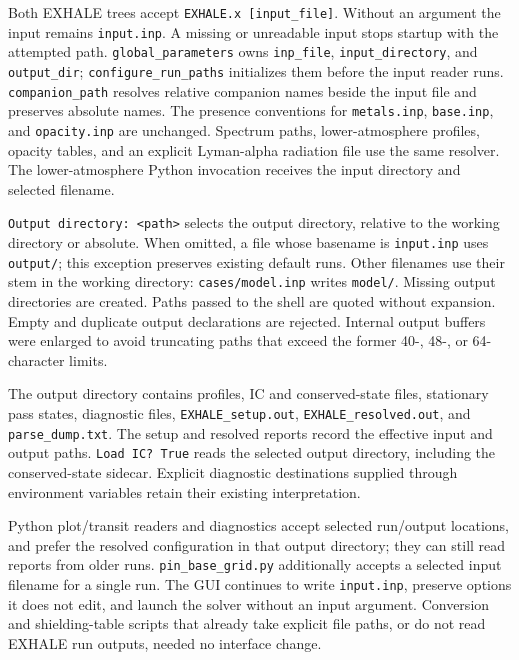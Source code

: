 \documentclass[english,a4paper]{my_memo}
\begin{document}
Both EXHALE trees accept \texttt{EXHALE.x\ {[}input\_file{]}}. Without an argument the
input remains \texttt{input.inp}. A missing or unreadable input stops startup with
the attempted path. \texttt{global\_parameters} owns \texttt{inp\_file}, \texttt{input\_directory},
and \texttt{output\_dir}; \texttt{configure\_run\_paths} initializes them before the input
reader runs. \texttt{companion\_path} resolves relative companion names beside the
input file and preserves absolute names. The presence conventions for
\texttt{metals.inp}, \texttt{base.inp}, and \texttt{opacity.inp} are unchanged. Spectrum paths,
lower-atmosphere profiles, opacity tables, and an explicit Lyman-alpha
radiation file use the same resolver. The lower-atmosphere Python invocation
receives the input directory and selected filename.

\texttt{Output\ directory:\ \textless{}path\textgreater{}} selects the output directory, relative to the
working directory or absolute. When omitted, a file whose basename is
\texttt{input.inp} uses \texttt{output/}; this exception preserves existing default runs.
Other filenames use their stem in the working directory: \texttt{cases/model.inp}
writes \texttt{model/}. Missing output directories are created. Paths passed to the
shell are quoted without expansion. Empty and duplicate output declarations
are rejected. Internal output buffers were enlarged to avoid truncating
paths that exceed the former 40-, 48-, or 64-character limits.

The output directory contains profiles, IC and conserved-state files,
stationary pass states, diagnostic files, \texttt{EXHALE\_setup.out},
\texttt{EXHALE\_resolved.out}, and \texttt{parse\_dump.txt}. The setup and resolved reports
record the effective input and output paths. \texttt{Load\ IC?\ True} reads the
selected output directory, including the conserved-state sidecar.
Explicit diagnostic destinations supplied through environment variables
retain their existing interpretation.

Python plot/transit readers and diagnostics accept selected run/output
locations, and prefer the resolved configuration in that output directory;
they can still read reports from older runs. \texttt{pin\_base\_grid.py} additionally
accepts a selected input filename for a single run. The GUI continues to
write \texttt{input.inp}, preserve options it does not edit, and launch the solver
without an input argument. Conversion and shielding-table scripts that
already take explicit file paths, or do not read EXHALE run outputs, needed
no interface change.
\end{document}
